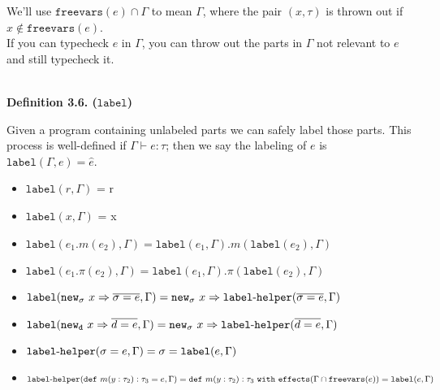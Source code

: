 \documentclass{llncs}
\newcommand{\keywadj}[1]{\mathtt{#1}}
\newcommand{\keyw}[1]{\keywadj{#1}~}
\newcommand{\hyphen}{\hbox{-}}
\begin{document}
\noindent
{} We'll use $\keywadj{freevars}(e) \cap \Gamma$ to mean $\Gamma$, where the pair $(x,\tau)$ is thrown out if $x \notin \keywadj{freevars}(e)$. \\

\noindent
{} If you can typecheck $e$ in $\Gamma$, you can throw out the parts in $\Gamma$ not relevant to $e$ and still typecheck it.\\\\

\begin{large}
\bf{Definition 3.6. ($\keywadj{label}$)}
\end{large}

Given a program containing unlabeled parts we can safely label those parts. This process is well-defined if $\Gamma \vdash e:  \tau$; then we say the labeling of $e$ is $\keywadj{label}(\Gamma, e) = \hat e$.

\begin{itemize}
	\item $\keywadj{label}(r, \Gamma)$ = r
	\item $\keywadj{label}(x, \Gamma)$ = x
	\item $\keywadj{label}(e_1.m(e_2), \Gamma) = \keywadj{label}(e_1, \Gamma).m(\keywadj{label}(e_2), \Gamma)$
	\item $\keywadj{label}(e_1.\pi(e_2), \Gamma) = \keywadj{label}(e_1, \Gamma).\pi(\keywadj{label}(e_2), \Gamma)$
	\item $\keywadj{label}(\keyw{new_\sigma} x \Rightarrow \overline{\sigma = e}, \Gamma) = \keywadj{new}_\sigma~x \Rightarrow \keywadj{label \hyphen helper}(\overline{\sigma = e}, \Gamma)$
	\item $\keywadj{label}(\keyw{new_d} x \Rightarrow \overline{d = e}, \Gamma) = \keyw{new_\sigma} x \Rightarrow \keywadj{label \hyphen helper}(\overline{d = e}, \Gamma)$
	\item $\keywadj{label \hyphen helper}(\sigma = e, \Gamma) = \sigma = \keywadj{label}(e, \Gamma)$
	\item $\keywadj{label \hyphen helper}(\keywadj{def}~m(y : \tau_2) : \tau_3 = e, \Gamma) = \keywadj{def}~m(y : \tau_2) : \tau_3~\keyw{with} \keywadj{effects}(\Gamma \cap \keywadj{freevars}(e)) = \keywadj{label}(e, \Gamma)$
\end{itemize}
\end{document}
